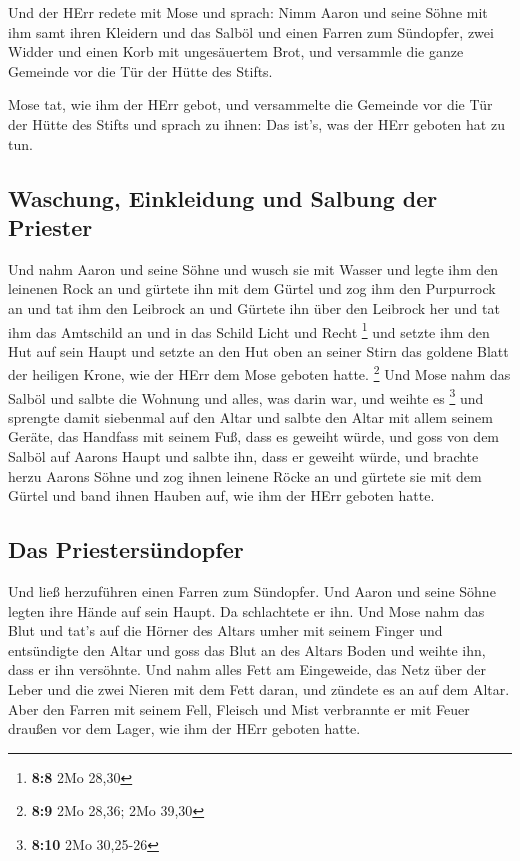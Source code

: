  Und der HErr redete mit Mose und sprach: 
Nimm Aaron und seine Söhne mit ihm samt ihren Kleidern und das Salböl
und einen Farren zum Sündopfer, zwei Widder und einen Korb mit
ungesäuertem Brot,  und versammle die ganze Gemeinde vor
die Tür der Hütte des Stifts.

 Mose tat, wie ihm der HErr gebot, und versammelte die
Gemeinde vor die Tür der Hütte des Stifts  und sprach zu
ihnen: Das ist's, was der HErr geboten hat zu tun.

\hypertarget{waschung-einkleidung-und-salbung-der-priester}{%
\subsection{Waschung, Einkleidung und Salbung der
Priester}\label{waschung-einkleidung-und-salbung-der-priester}}

 Und nahm Aaron und seine Söhne und wusch sie mit Wasser
 und legte ihm den leinenen Rock an und gürtete ihn mit
dem Gürtel und zog ihm den Purpurrock an und tat ihm den Leibrock an und
Gürtete ihn über den Leibrock her  und tat ihm das
Amtschild an und in das Schild Licht und Recht \footnote{\textbf{8:8}
  2Mo 28,30}  und setzte ihm den Hut auf sein Haupt und
setzte an den Hut oben an seiner Stirn das goldene Blatt der heiligen
Krone, wie der HErr dem Mose geboten hatte. \footnote{\textbf{8:9} 2Mo
  28,36; 2Mo 39,30}  Und Mose nahm das Salböl und salbte
die Wohnung und alles, was darin war, und weihte es \footnote{\textbf{8:10}
  2Mo 30,25-26}  und sprengte damit siebenmal auf den
Altar und salbte den Altar mit allem seinem Geräte, das Handfass mit
seinem Fuß, dass es geweiht würde,  und goss von dem
Salböl auf Aarons Haupt und salbte ihn, dass er geweiht würde,
 und brachte herzu Aarons Söhne und zog ihnen leinene
Röcke an und gürtete sie mit dem Gürtel und band ihnen Hauben auf, wie
ihm der HErr geboten hatte.

\hypertarget{das-priestersuxfcndopfer}{%
\subsection{Das Priestersündopfer}\label{das-priestersuxfcndopfer}}

 Und ließ herzuführen einen Farren zum Sündopfer. Und
Aaron und seine Söhne legten ihre Hände auf sein Haupt. 
Da schlachtete er ihn. Und Mose nahm das Blut und tat's auf die Hörner
des Altars umher mit seinem Finger und entsündigte den Altar und goss
das Blut an des Altars Boden und weihte ihn, dass er ihn versöhnte.
 Und nahm alles Fett am Eingeweide, das Netz über der
Leber und die zwei Nieren mit dem Fett daran, und zündete es an auf dem
Altar.  Aber den Farren mit seinem Fell, Fleisch und Mist
verbrannte er mit Feuer draußen vor dem Lager, wie ihm der HErr geboten
hatte.

